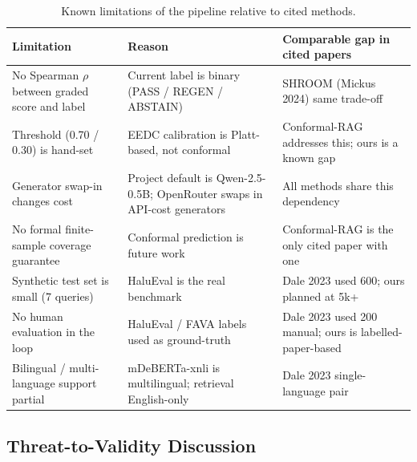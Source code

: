 \begin{table}[ht]
\centering
\small
\begin{tabular}{p{4.5cm}p{6cm}p{4cm}}
\hline
\textbf{Limitation} & \textbf{Reason} & \textbf{Comparable gap in cited papers} \\
\hline
No Spearman $\rho$ between graded score and label & Current label is binary (PASS / REGEN / ABSTAIN) & SHROOM (Mickus 2024) same trade-off \\
Threshold (0.70 / 0.30) is hand-set & EEDC calibration is Platt-based, not conformal & Conformal-RAG addresses this; ours is a known gap \\
Generator swap-in changes cost & Project default is Qwen-2.5-0.5B; OpenRouter swaps in API-cost generators & All methods share this dependency \\
No formal finite-sample coverage guarantee & Conformal prediction is future work & Conformal-RAG is the only cited paper with one \\
Synthetic test set is small (7 queries) & HaluEval is the real benchmark & Dale 2023 used 600; ours planned at 5k+ \\
No human evaluation in the loop & HaluEval / FAVA labels used as ground-truth & Dale 2023 used 200 manual; ours is labelled-paper-based \\
Bilingual / multi-language support partial & mDeBERTa-xnli is multilingual; retrieval English-only & Dale 2023 single-language pair \\
\hline
\end{tabular}
\caption{Known limitations of the pipeline relative to cited methods.}
\label{tab:limitations}
\end{table}

\subsection{Threat-to-Validity Discussion}
\label{sec:threat-validity}

